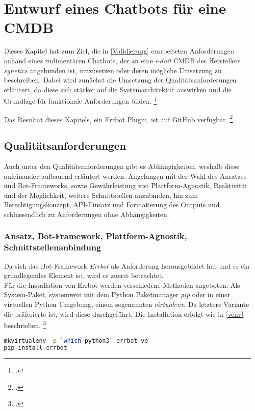 \chapter{Entwurf eines Chatbots für eine CMDB} \label{Praxis}

Dieses Kapitel hat zum Ziel, die in \autoref{Validierung} erarbeiteten Anforderungen anhand eines rudimentären Chatbots, der an eine \textit{i-doit} \acs{CMDB} des Herstellers \textit{synetics} angebunden ist, umzusetzen oder deren mögliche Umsetzung zu beschreiben. Dabei wird zunächst die Umsetzung der Qualitätsanforderungen erläutert, da diese sich stärker auf die Systemarchitektur auswirken und die Grundlage für funktionale Anforderungen bilden.
\footcite[Vgl.][9]{Pohl_2015_Requirements}

Das Resultat dieses Kapitels, ein Errbot Plugin, ist auf GitHub verfügbar.
\footcite[Vgl.][o. \pno]{Weiss_2019_GitHub}

\section{Qualitätsanforderungen}

Auch unter den Qualitätsanforderungen gibt es Abhängigkeiten, weshalb diese aufeinander aufbauend erläutert werden. Angefangen mit der Wahl des Ansatzes und Bot-Frameworks, sowie Gewährleistung von Plattform-Agnostik, Reaktivität und der Möglichkeit, weitere Schnittstellen anzubinden, hin zum Berechtigungskonzept, API-Einsatz und Formatierung des Outputs und schlussendlich zu Anforderungen ohne Abhängigkeiten. 


\subsection{Ansatz, Bot-Framework, Plattform-Agnostik, Schnittstellenanbindung}

Da sich das Bot-Framework \textit{Errbot} als Anforderung herausgebildet hat und es ein grundlegendes Element ist, wird es zuerst betrachtet.\\
Für die Installation von Errbot werden verschiedene Methoden angeboten: Als System-Paket, systemweit mit dem Python Paketmanager \textit{pip} oder in einer virtuellen Python Umgebung, einem sogenannten \textit{virtualenv}. Da letztere Variante die präferierte ist, wird diese durchgeführt. Die Installation erfolgt wie in \autoref{venv} beschrieben.
\footcite[Vgl.][o. \pno]{errbot_2018_setup}

\begin{lstlisting}[language=bash, label=venv, caption=Virtualenv Einrichtung und Errbot Installation]
mkvirtualenv -p `which python3` errbot-ve
pip install errbot
\end{lstlisting}

